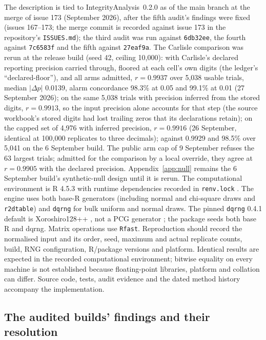 \documentclass[11pt,a4paper]{article}
\newcommand{\pkg}{\textsf{IntegrityAnalysis}}
\begin{document}
The description is tied to \pkg\ 0.2.0 as of the main branch at the merge of issue 173 (September 2026), after the fifth audit's findings were fixed (issues 167--173; the merge commit is recorded against issue 173 in the repository's \texttt{ISSUES.md}); the third audit was run against \texttt{6db32ee}, the fourth against \texttt{7c6583f} and the fifth against \texttt{27eaf9a}. The Carlisle comparison was rerun at the release build (seed 42, ceiling 10,000): with Carlisle's declared reporting precision carried through, floored at each cell's own digits (the ledger's ``declared-floor''), and all arms admitted, $r = 0.9937$ over 5,038 usable trials, median $|\Delta p|$ 0.0139, alarm concordance 98.3\% at 0.05 and 99.1\% at 0.01 (27 September 2026); on the same 5,038 trials with precision inferred from the stored digits, $r = 0.9913$, so the input precision alone accounts for that step (the source workbook's stored digits had lost trailing zeros that its declarations retain); on the capped set of 4,976 with inferred precision, $r = 0.9916$ (26 September, identical at 100,000 replicates to three decimals); against 0.9929 and 98.5\% over 5,041 on the 6 September build. The public arm cap of 9 September refuses the 63 largest trials; admitted for the comparison by a local override, they agree at $r = 0.9905$ with the declared precision. Appendix~\ref{app:null} remains the 6 September build's synthetic-null design until it is rerun. The computational environment is R 4.5.3 with runtime dependencies recorded in \texttt{renv.lock} \citep{rcore,shafer2026}. The engine uses both base-R generators (including normal and chi-square draws and \texttt{r2dtable}) and \texttt{dqrng} for bulk uniform and normal draws. The pinned \texttt{dqrng} 0.4.1 default is Xoroshiro128++ \citep{blackman2021}, not a PCG generator \citep{oneill2014,dqrng}; the package seeds both base R and dqrng. Matrix operations use \texttt{Rfast}. Reproduction should record the normalised input and its order, seed, maximum and actual replicate counts, build, RNG configuration, R/package versions and platform. Identical results are expected in the recorded computational environment; bitwise equality on every machine is not established because floating-point libraries, platform and collation can differ. Source code, tests, audit evidence and the dated method history accompany the implementation.

\subsection{The audited builds' findings and their resolution}
\label{sec:buildstatus}
\end{document}
